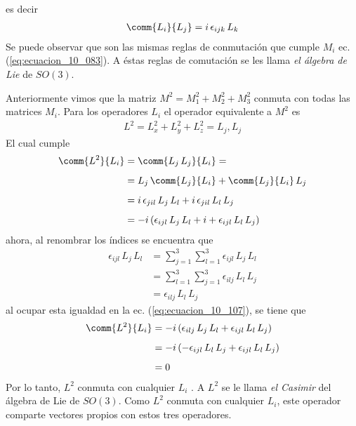 es decir
\begin{align}
\comm{L_{i}}{L_{j}} = i \, \epsilon_{ijk} \, L_{k}
\label{eq:ecuacion_10_105}
\end{align}
Se puede observar que son las mismas reglas de conmutación que cumple $M_{i}$ ec. (\ref{eq:ecuacion_10_083}). A éstas reglas de comutación se les llama \emph{el álgebra de Lie} de
$SO(3)$.
\par
Anteriormente vimos que la matriz $M^{2} = M_{1}^{2} + M_{2}^{2} + M_{3}^{2}$ conmuta con todas las matrices $M_{i}$. Para los operadores $L_{i}$ el operador equivalente a $M^{2}$ es
\begin{align}
L^{2} = L_{x}^{2} + L_{y}^{2} + L_{z}^{2} = L_{j} , L_{j} 
\label{eq:ecuacion_10_106}
\end{align}
El cual cumple
\begin{align}
\comm{L^{2}}{L_{i}} &= \comm{L_{j} \, L_{j}}{L_{i}} = \nonumber \\[0.5em]
&= L_{j} \, \comm{L_{j}}{L_{i}} + \comm{L_{j}}{L_{i}} \, L_{j} \nonumber \\[0.5em]
&= i \, \epsilon_{jil} \, L_{j} \, L_{l} + i \, \epsilon_{jil} \, L_{l} \, L_{j} \nonumber \\[0.5em]  
&= - i \, (\epsilon_{ijl} \, L_{j} \, L_{l} + i + \epsilon_{ijl} \, L_{l} \, L_{j}) \label{eq:ecuacion_10_107}
\end{align}
ahora, al renombrar los índices se encuentra que
\begin{align}
\epsilon_{ijl} \, L_{j} \, L_{l} &= \sum_{j=1}^{3} \sum_{l=1}^{3} \epsilon_{ijl} \, L_{j} \, L_{l} \nonumber \\[0.5em]
&= \sum_{l=1}^{3} \sum_{j=1}^{3} \epsilon_{ilj} \, L_{l} \, L_{j} \nonumber \\[0.5em]
&= \epsilon_{ilj} \, L_{l} \, L_{j} \label{eq:ecuacion_10_108}
\end{align}
al ocupar esta igualdad en la ec. (\ref{eq:ecuacion_10_107}), se tiene que
\begin{align}
\comm{L^{2}}{L_{i}} &= - i \, (\epsilon_{ilj} \, L_{j} \, L_{l} + \epsilon_{ijl} \, L_{l} \, L_{j}) \nonumber \\[0.5em]
&= - i \, (- \epsilon_{ijl} \, L_{l} \, L_{j} + \epsilon_{ijl} \, L_{l} \, L_{j}) \nonumber \\[0.5em]
&= 0 \label{eq:ecuacion_10_109}
\end{align}
Por lo tanto, $L^{2}$ conmuta con cualquier $L_{i}$ . A $L^{2}$ se le llama \emph{el Casimir} del álgebra de Lie de $SO(3)$. Como $L^{2}$ conmuta con cualquier $L_{i}$, este operador comparte vectores propios con estos tres operadores.
